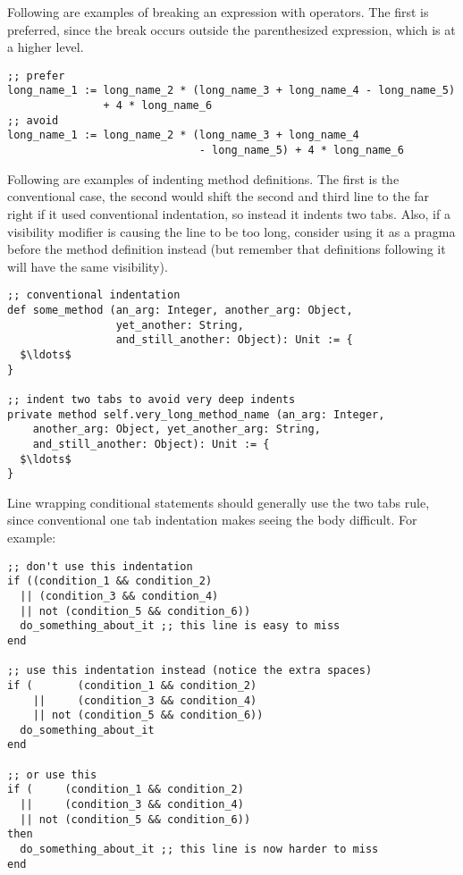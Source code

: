 \example Following are examples of breaking an expression with operators. The first is preferred, since the break occurs outside the parenthesized expression, which is at a higher level. 

\begin{lstlisting}
;; prefer
long_name_1 := long_name_2 * (long_name_3 + long_name_4 - long_name_5)
               + 4 * long_name_6
;; avoid
long_name_1 := long_name_2 * (long_name_3 + long_name_4 
                              - long_name_5) + 4 * long_name_6
\end{lstlisting}

\example Following are examples of indenting method definitions. The first is the conventional case, the second would shift the second and third line to the far right if it used conventional indentation, so instead it indents two tabs. Also, if a visibility modifier is causing the line to be too long, consider using it as a pragma before the method definition instead (but remember that definitions following it will have the same visibility). 

\begin{lstlisting}
;; conventional indentation
def some_method (an_arg: Integer, another_arg: Object, 
                 yet_another: String,
                 and_still_another: Object): Unit := {
  $\ldots$
}

;; indent two tabs to avoid very deep indents
private method self.very_long_method_name (an_arg: Integer,
    another_arg: Object, yet_another_arg: String, 
    and_still_another: Object): Unit := {
  $\ldots$
}
\end{lstlisting}

\example Line wrapping conditional statements should generally use the two tabs rule, since conventional one tab indentation makes seeing the body difficult. For example: 

\begin{lstlisting}
;; don't use this indentation
if ((condition_1 && condition_2)
  || (condition_3 && condition_4)
  || not (condition_5 && condition_6))
  do_something_about_it ;; this line is easy to miss
end

;; use this indentation instead (notice the extra spaces)
if (       (condition_1 && condition_2)
    ||     (condition_3 && condition_4)
    || not (condition_5 && condition_6))
  do_something_about_it
end

;; or use this
if (     (condition_1 && condition_2)
  ||     (condition_3 && condition_4)
  || not (condition_5 && condition_6))
then
  do_something_about_it ;; this line is now harder to miss
end
\end{lstlisting}

